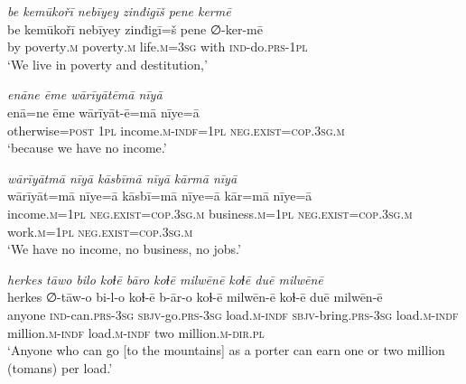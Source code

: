 \ea \label{ŽM.58}
\textit{be kemūkořī nebīyey zinđigīš pene kermē} \\ 
\gll be kemūkořī nebīyey zinđigī=š pene ∅-ker-mē \\ 
 by poverty\textsc{.m} poverty\textsc{.m} life\textsc{.m}\textsc{=3sg} with \textsc{ind-}do\textsc{.prs}\textsc{-\textsc{1pl}} \\ 
\glt `We live in poverty and destitution,'
\z 
 
\ea \label{ŽM.59}
\textit{enāne ēme wārīyātēmā nīyā} \\ 
\gll enā=ne ēme wārīyāt-ē=mā nīye=ā \\ 
 otherwise\textsc{=\textsc{post}} \textsc{1pl} income\textsc{.m}\textsc{-indf}\textsc{=\textsc{1pl}} \textsc{\textsc{neg.}exist}\textsc{=cop}\textsc{.3sg}\textsc{.m} \\ 
\glt `because we have no income.'
\z 
 
\ea \label{ŽM.60}
\textit{wārīyātmā nīyā kāsbīmā nīyā kārmā nīyā} \\ 
\gll wārīyāt=mā nīye=ā kāsbī=mā nīye=ā kār=mā nīye=ā \\ 
 income\textsc{.m}\textsc{=\textsc{1pl}} \textsc{\textsc{neg.}exist}\textsc{=cop}\textsc{.3sg}\textsc{.m} business\textsc{.m}\textsc{=\textsc{1pl}} \textsc{\textsc{neg.}exist}\textsc{=cop}\textsc{.3sg}\textsc{.m} work\textsc{.m}\textsc{=\textsc{1pl}} \textsc{\textsc{neg.}exist}\textsc{=cop}\textsc{.3sg}\textsc{.m} \\ 
\glt `We have no income, no business, no jobs.'
\z 
 
\ea \label{ŽM.61}
\textit{herkes tāwo bilo koɫē bāro koɫē milwēnē koɫē duē milwēnē} \\ 
\gll herkes ∅-tāw-o bi-l-o koɫ-ē b-ār-o koɫ-ē milwēn-ē koɫ-ē duē milwēn-ē \\ 
 anyone \textsc{ind-}can\textsc{.prs}\textsc{-3sg} \textsc{sbjv-}go\textsc{.prs}\textsc{-3sg} load\textsc{.m}\textsc{-indf} \textsc{sbjv-}bring\textsc{.prs}\textsc{-3sg} load\textsc{.m}\textsc{-indf} million\textsc{.m}\textsc{-indf} load\textsc{.m}\textsc{-indf} two million\textsc{.m}\textsc{-dir}\textsc{.pl} \\ 
\glt `Anyone who can go [to the mountains] as a porter can earn one or two million (tomans) per load.'
\z 
 
